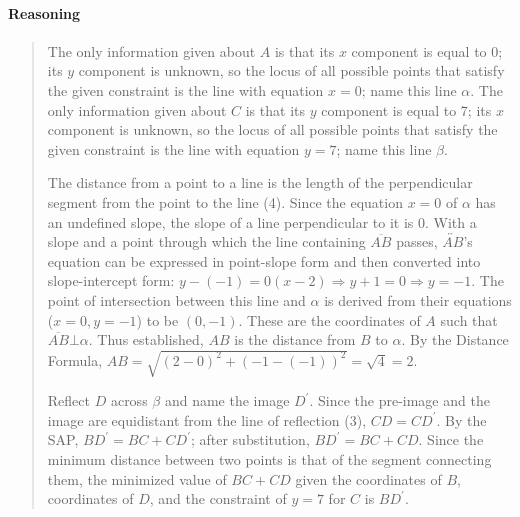 \documentclass[letterpaper,12pt,twoside]{report}
\begin{document}
	\paragraph{Reasoning}
	\begin{quotation}
		
		The only information given about $A$ is that its $x$ component is equal to 0; its $y$ component is unknown, so the locus of all possible points that satisfy the given constraint is the line with equation $x=0$; name this line $\alpha$. The only information given about $C$ is that its $y$ component is equal to 7; its $x$ component is unknown, so the locus of all possible points that satisfy the given constraint is the line with equation $y=7$; name this line $\beta$.
		
		The distance from a point to a line is the length of the perpendicular segment from the point to the line (4). Since the equation $x=0$ of $\alpha$ has an undefined slope, the slope of a line perpendicular to it is 0. With a slope and a point through which the line containing $\overline{AB}$ passes, $\overleftrightarrow{AB}$'s equation can be expressed in point-slope form and then converted into slope-intercept form: $y-(-1)=0(x-2) \Rightarrow y+1=0 \Rightarrow y=-1$. The point of intersection between this line and $\alpha$ is derived from their equations ($x=0, y=-1$) to be $(0,-1)$. These are the coordinates of $A$ such that $\overline{AB}\bot\alpha$. Thus established, $AB$ is the distance from $B$ to $\alpha$. By the Distance Formula, $AB=\sqrt{(2-0)^2+(-1-(-1))^2}=\sqrt{4}=2$.
		
		Reflect $D$ across $\beta$ and name the image $D^\prime$. Since the pre-image and the image are equidistant from the line of reflection (3), $CD=CD^\prime$. By the SAP, $BD^\prime=BC+CD^\prime$; after substitution, $BD^\prime=BC+CD$. Since the  minimum distance between two points is that of the segment connecting them, the minimized value of $BC+CD$ given the coordinates of $B$, coordinates of $D$, and the constraint of $y=7$ for $C$ is $BD^\prime$. 
		

\end{quotation}
\end{document}
